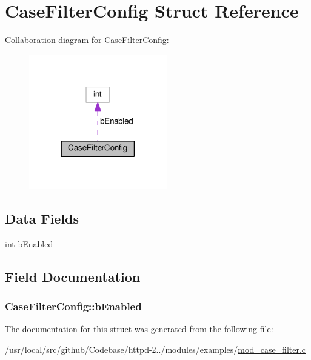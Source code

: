 \hypertarget{structCaseFilterConfig}{}\section{Case\+Filter\+Config Struct Reference}
\label{structCaseFilterConfig}


Collaboration diagram for Case\+Filter\+Config\+:
\nopagebreak
\begin{figure}[H]
\begin{center}
\leavevmode
\includegraphics[width=170pt]{structCaseFilterConfig__coll__graph}
\end{center}
\end{figure}
\subsection*{Data Fields}
\begin{DoxyCompactItemize}
\item 
\hyperlink{pcre_8txt_a42dfa4ff673c82d8efe7144098fbc198}{int} \hyperlink{structCaseFilterConfig_a3474836cd68ba79758071507422aeb5a}{b\+Enabled}
\end{DoxyCompactItemize}


\subsection{Field Documentation}
\subsubsection[{\texorpdfstring{b\+Enabled}{bEnabled}}]{ Case\+Filter\+Config\+::b\+Enabled}\hypertarget{structCaseFilterConfig_a3474836cd68ba79758071507422aeb5a}{}\label{structCaseFilterConfig_a3474836cd68ba79758071507422aeb5a}


The documentation for this struct was generated from the following file\+:\begin{DoxyCompactItemize}
\item 
/usr/local/src/github/\+Codebase/httpd-\/2../modules/examples/\hyperlink{mod__case__filter_8c}{mod\+\_\+case\+\_\+filter.\+c}\end{DoxyCompactItemize}
